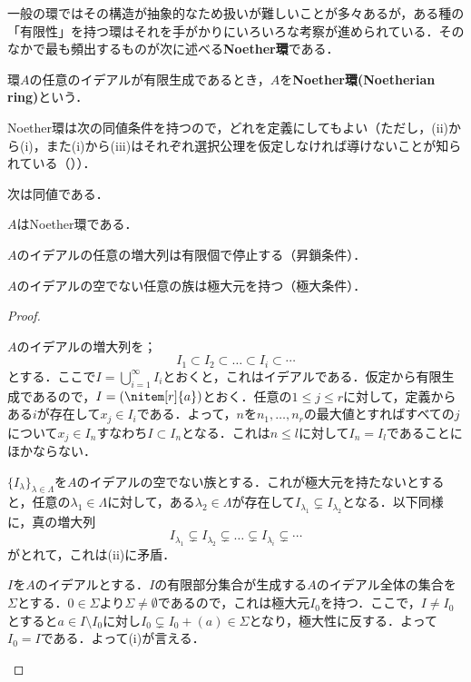 一般の環ではその構造が抽象的なため扱いが難しいことが多々あるが，ある種の「有限性」を持つ環はそれを手がかりにいろいろな考察が進められている．そのなかで最も頻出するものが次に述べる\textbf{Noether環}である．

\begin{defi}[Noether環]
	環$A$の任意のイデアルが有限生成であるとき，$A$を\textbf{Noether環(Noetherian ring)}という．
\end{defi}

Noether環は次の同値条件を持つので，どれを定義にしてもよい（ただし，(ii)から(i)，また(i)から(iii)はそれぞれ選択公理を仮定しなければ導けないことが知られている（\cite{Hodges1974}））．

\begin{prop}
	次は同値である．
	\begin{sakura}
		\item $A$はNoether環である．
		\item $A$のイデアルの任意の増大列は有限個で停止する（昇鎖条件）．
		\item $A$のイデアルの空でない任意の族は極大元を持つ（極大条件）．
	\end{sakura}
\end{prop}

\begin{proof}
	\begin{eqv}[3]
		\item 
		$A$のイデアルの増大列を；
		\[I_1\subset I_2\subset\dots\subset I_i\subset\cdots\]
		とする．ここで$I=\bigcup_{i=1}^\infty I_i$とおくと，これはイデアルである．仮定から有限生成であるので，$I=(\nitem[r]{a})$とおく．任意の$1\leq j\leq r$に対して，定義からある$i$が存在して$x_j\in I_i$である．よって，$n$を$n_1,\dots,n_r$の最大値とすればすべての$j$について$x_j\in I_n$すなわち$I\subset I_{n}$となる．これは$n\leq l$に対して$I_{n}=I_l$であることにほかならない．
		\item
		$\{I_{\lambda}\}_{\lambda\in\Lambda}$を$A$のイデアルの空でない族とする．これが極大元を持たないとすると，任意の$\lambda_1\in\Lambda$に対して，ある$\lambda_2\in\Lambda$が存在して$I_{\lambda_1}\subsetneq I_{\lambda_2}$となる．以下同様に，真の増大列
		\[I_{\lambda_1}\subsetneq I_{\lambda_2}\subsetneq\dots\subsetneq I_{\lambda_i}\subsetneq\cdots\]
		がとれて，これは(ii)に矛盾．
		\item 
		$I$を$A$のイデアルとする．$I$の有限部分集合が生成する$A$のイデアル全体の集合を$\Sigma$とする．$0\in\Sigma$より$\Sigma\neq\emptyset$であるので，これは極大元$I_0$を持つ．ここで，$I\neq I_0$とすると$a\in I\setminus I_0$に対し$I_0\subsetneq I_0+(a)\in\Sigma$となり，極大性に反する．よって$I_0=I$である．よって(i)が言える．
	\end{eqv}
\end{proof}

